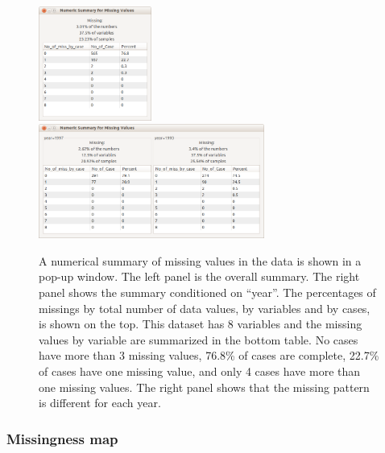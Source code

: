 \documentclass[article]{jss}
\begin{document}
\begin{center}
\begin{figure}[h]
\begin{centering}
\includegraphics[width=0.33\textwidth]{graph/fig2-summary-1}
\includegraphics[width=0.66\textwidth]{graph/fig2-summary-2-condition}
\par\end{centering}
\caption{A numerical summary of missing values in the data is
shown in a pop-up window. The left panel is the overall summary.
The right panel shows the summary conditioned on ``year''. The
percentages of missings by total number of data values, by
variables and by cases, is shown on the top. This dataset has
8 variables and the missing values by variable are summarized
in the bottom table. No cases have more than 3 missing values,
76.8\% of cases are complete, 22.7\% of cases have one missing
value, and only 4 cases have more than one missing values. The
right panel shows that the missing pattern is different for each year.}
\label{fig: num-summry}
\end{figure}
\par\end{center}

\subsubsection{Missingness map}
\end{document}
